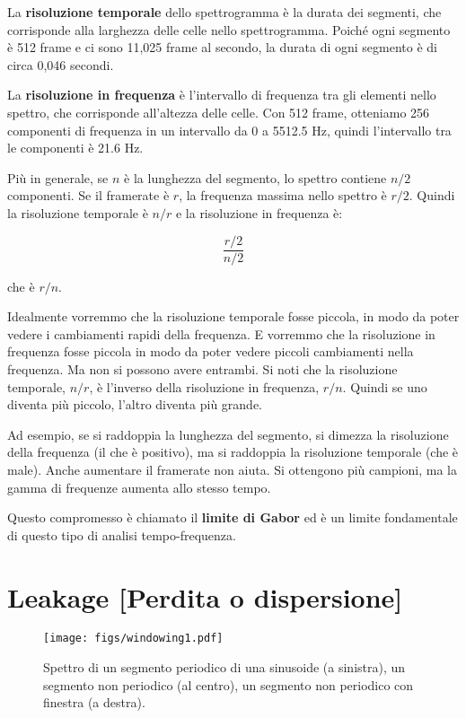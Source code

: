 \documentclass[12pt,a4paper]{book}
\begin{document}
La {\bf risoluzione temporale} dello spettrogramma è la durata dei segmenti, che corrisponde alla larghezza delle celle nello spettrogramma. Poiché ogni segmento è 512 frame e ci sono 11,025 frame al secondo, la durata di ogni segmento è di circa 0,046 secondi.

La {\bf risoluzione in frequenza} è l'intervallo di frequenza tra gli elementi nello spettro, che corrisponde all'altezza delle celle. Con 512 frame, otteniamo 256 componenti di frequenza in un intervallo da 0 a 5512.5 Hz, quindi l'intervallo tra le componenti è 21.6 Hz.

Più in generale, se $n$ è la lunghezza del segmento, lo spettro contiene $n/2$ componenti. Se il framerate è $r$, la frequenza massima nello spettro è $r/2$. Quindi la risoluzione temporale è $n/r$ e la risoluzione in frequenza è:

%
\[ \frac{r/2}{n/2} \] 

%
che è $r/n$.

Idealmente vorremmo che la risoluzione temporale fosse piccola, in modo da poter vedere i cambiamenti rapidi della frequenza. E vorremmo che la risoluzione in frequenza fosse piccola in modo da poter vedere piccoli cambiamenti nella frequenza. Ma non si possono avere entrambi. Si noti che la risoluzione temporale, $n/r$, è l'inverso della risoluzione in frequenza, $r/n$. Quindi se uno diventa più piccolo, l'altro diventa più grande.

Ad esempio, se si raddoppia la lunghezza del segmento, si dimezza la risoluzione della frequenza (il che è positivo), ma si raddoppia la risoluzione temporale (che è male). Anche aumentare il framerate non aiuta. Si ottengono più campioni, ma la gamma di frequenze aumenta allo stesso tempo.

Questo compromesso è chiamato il {\bf limite di Gabor} ed è un limite fondamentale di questo tipo di analisi tempo-frequenza.

\section{Leakage [Perdita o dispersione]} 

\begin{figure} 

\centerline{\texttt{[image: figs/windowing1.pdf]}} \caption{Spettro di un segmento periodico di una sinusoide (a sinistra), un segmento non periodico (al centro), un segmento non periodico con finestra (a destra).} \label{fig.windowing1} \end{figure} 
\end{document}
